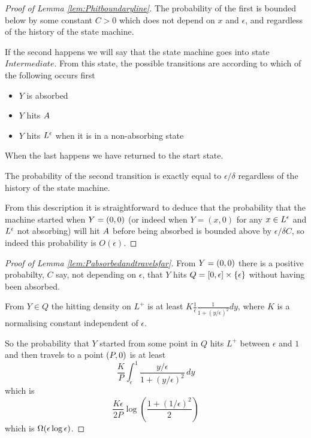 {\begin{proof}[Proof of Lemma \ref{lem:Phitboundaryline}]
The probability of the first is bounded below by some constant $C > 0$
which does not depend on $x$ and $\epsilon$, and regardless of the
history of the state machine.

\newcommand{\stateintermediate}{Intermediate}

If the second happens we will say that the state machine goes into
state $\stateintermediate$.  From this state, the possible transitions
are according to which of the following occurs first

\begin{itemize}
\item $Y$ is absorbed
\item $Y$ hits $A$
\item $Y$ hits $L^\epsilon$ when it is in a non-absorbing state
\end{itemize}

When the last happens we have returned to the start state.

The probability of the second transition is exactly equal to
$\epsilon/\delta$ regardless of the history of the state machine.

From this description it is straightforward to deduce that the
probability that the machine started when $Y = (0,0)$ (or indeed when
$Y = (x, 0)$ for any $x \in L^\epsilon$ and $L^\epsilon$ not absorbing) will hit
$A$ before being absorbed is
bounded above by $\epsilon/\delta C$, so indeed this probability is
$O(\epsilon)$.
\end{proof}

\begin{proof}[Proof of Lemma \ref{lem:Pabsorbedandtravelsfar}]
From $Y = (0,0)$ there is a positive probabilty, $C$ say, not
depending on $\epsilon$, that $Y$ hits $Q = [0, \epsilon] \times
\{\epsilon\}$ without having been absorbed.

From $Y \in Q$ the hitting density on $L^+$ is at least $K
\frac{1}{\epsilon} \frac{1}{1 + (y/\epsilon)^2} dy$, where $K$ is a
normalising constant independent of $\epsilon$.

So the probability that $Y$ started from some point in $Q$ hits $L^+$
between $\epsilon$ and $1$ and then travels to a point $(P,0)$ is at least
\[
\frac{K}{P} \int_{\epsilon}^{1} \frac{y/\epsilon}{1 + (y/\epsilon)^2}
\, dy
\]
which is
\[
\frac{K\epsilon}{2P} \log\left(\frac{1 + (1/\epsilon)^2}{2}\right)
\]
which is $\Omega(\epsilon\log\epsilon)$.
\end{proof}
}
